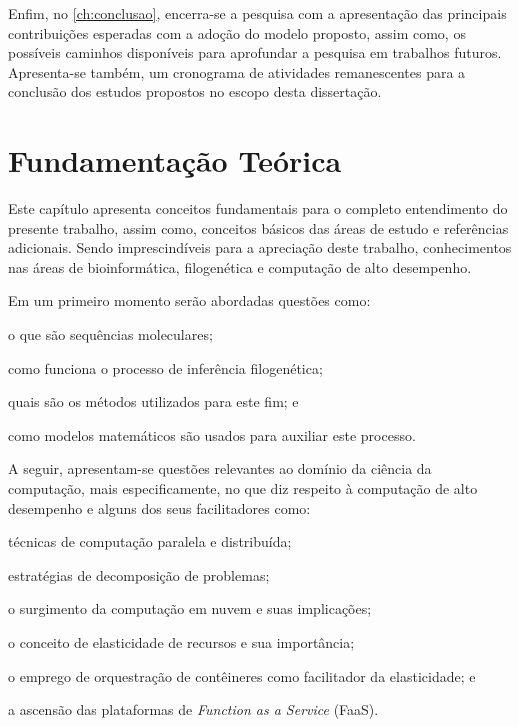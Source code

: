 \documentclass[english,brazilian]{UNISINOSmonografia} %
\begin{document}
Enfim, no \autoref{ch:conclusao}, encerra-se a pesquisa com a apresentação das principais contribuições esperadas com a adoção do modelo proposto, assim como, os possíveis caminhos disponíveis para aprofundar a pesquisa em trabalhos futuros.
Apresenta-se também, um cronograma de atividades remanescentes para a conclusão dos estudos propostos no escopo desta dissertação.


\chapter{Fundamentação Teórica}
\label{ch:fundamentacao}




Este capítulo apresenta conceitos fundamentais para o completo entendimento do presente trabalho, assim como, conceitos básicos das áreas de estudo e referências adicionais.
Sendo imprescindíveis para a apreciação deste trabalho, conhecimentos nas áreas de bioinformática, filogenética e computação de alto desempenho.



Em um primeiro momento serão abordadas questões como:
\begin{inparaenum} 
	\item o que são sequências moleculares;
	\item como funciona o processo de inferência filogenética;
	\item quais são os métodos utilizados para este fim; e
	\item como modelos matemáticos são usados para auxiliar este processo.
\end{inparaenum}
A seguir, apresentam-se questões relevantes ao domínio da ciência da computação, mais especificamente, no que diz respeito à computação de alto desempenho e alguns dos seus facilitadores como:
\begin{inparaenum} 
	\item técnicas de computação paralela e distribuída;
	\item estratégias de decomposição de problemas;
	\item o surgimento da computação em nuvem e suas implicações;
	\item o conceito de elasticidade de recursos e sua importância;
	\item o emprego de orquestração de contêineres como facilitador da elasticidade; e
	\item a ascensão das plataformas de \textit{Function as a Service} (FaaS).
\end{inparaenum}
\end{document}
